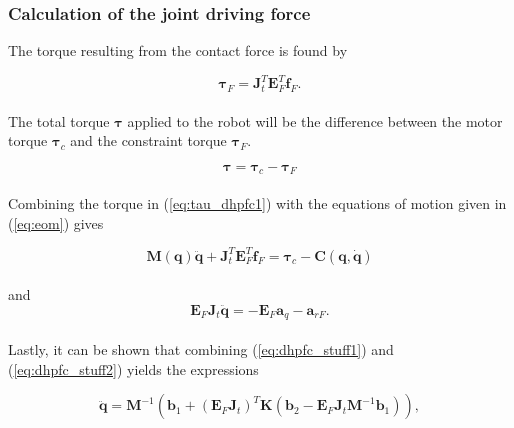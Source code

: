 
\subsubsection{Calculation of the joint driving force}

The torque resulting from the contact force is found by

\begin{equation}
    \boldsymbol{\tau}_F = \mathbf{J}_t^T \mathbf{E}_F^T \mathbf{f}_F.
\end{equation}
\\
The total torque $\boldsymbol{\tau}$ applied to the robot will be the difference between the motor torque $\boldsymbol{\tau}_c$ and the constraint torque $\boldsymbol{\tau}_F$.

\begin{equation}\label{eq:tau_dhpfc1}
    \boldsymbol{\tau} = \boldsymbol{\tau}_c - \boldsymbol{\tau}_F
\end{equation}
\\

Combining the torque in (\ref{eq:tau_dhpfc1}) with the equations of motion given in (\ref{eq:eom}) gives

\begin{equation}\label{eq:dhpfc_stuff1}
    \mathbf{M(q) \ddot{q}} + \mathbf{J}_t^T \mathbf{E}^T_F \mathbf{f}_F = \boldsymbol{\tau}_c - \mathbf{C(q, \dot{q})}
\end{equation}
\\
and
\begin{equation}\label{eq:dhpfc_stuff2}
    \mathbf{E}_F \mathbf{J}_t\mathbf{\ddot{q}} = - \mathbf{E}_F \mathbf{a}_q - \mathbf{a}_{rF}.
\end{equation}
\\
Lastly, it can be shown that combining (\ref{eq:dhpfc_stuff1}) and (\ref{eq:dhpfc_stuff2}) yields the expressions

\begin{equation}
    \mathbf{\ddot{q}} = \mathbf{M}^{-1}(\mathbf{b}_1 + (\mathbf{E}_F \mathbf{J}_t)^T \mathbf{K} (\mathbf{b}_2 - \mathbf{E}_F \mathbf{J}_t \mathbf{M}^{-1} \mathbf{b}_1)),
\end{equation}

